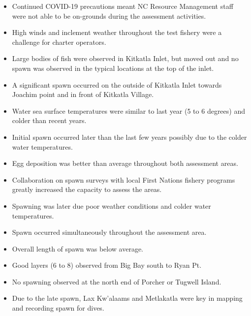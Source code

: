 \begin{itemize}
\item Continued COVID-19 precautions meant NC Resource Management staff were
not able to be on-grounds during the assessment activities.
\item High winds and inclement weather throughout the test fishery were a challenge for charter operators.
\item Large bodies of fish were observed in Kitkatla Inlet, but
moved out and no spawn was observed in the typical locations at the top of the inlet.
\item A significant spawn occurred on the outside of Kitkatla Inlet
towards Joachim point and in front of Kitkatla Village.
\item Water sea surface temperatures were similar to last year (5 to 6 degrees) and colder than recent years.
\item Initial spawn occurred later than the last few years possibly due to the colder water temperatures.
\item Egg deposition was better than average throughout both assessment areas.
\item Collaboration on spawn surveys with local First Nations fishery programs
greatly increased the capacity to assess the areas.

\item Spawning was later due poor weather conditions and colder water temperatures.
\item Spawn occurred simultaneously throughout the assessment area.
\item Overall length of spawn was below average.
\item Good layers (6 to 8) observed from Big Bay south to Ryan Pt.
\item No spawning observed at the north end of Porcher or Tugwell Island.
\item Due to the late spawn,
Lax Kw'alaams and Metlakatla were key in mapping and recording spawn for dives.
\end{itemize}